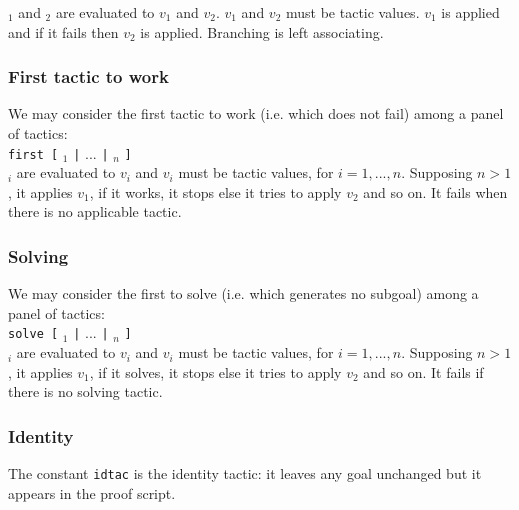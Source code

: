 {\tacexpr}$_1$ and {\tacexpr}$_2$ are evaluated to $v_1$ and
$v_2$. $v_1$ and $v_2$ must be tactic values. $v_1$ is applied and if
it fails then $v_2$ is applied. Branching is left associating.

\subsubsection{First tactic to work}

We may consider the first tactic to work (i.e. which does not fail) among a
panel of tactics:\\

{\tt first [} {\tacexpr}$_1$ {\tt |} $...$ {\tt |} {\tacexpr}$_n$ {\tt ]}\\

{\tacexpr}$_i$ are evaluated to $v_i$ and $v_i$ must be tactic values, for 
$i=1,...,n$. Supposing $n>1$, it applies $v_1$, if it works, it stops else it
tries to apply $v_2$ and so on. It fails when there is no applicable tactic.\\

\ErrMsg {}

\subsubsection{Solving}

We may consider the first to solve (i.e. which generates no subgoal) among a
panel of tactics:\\

{\tt solve [} {\tacexpr}$_1$ {\tt |} $...$ {\tt |} {\tacexpr}$_n$ {\tt ]}\\

{\tacexpr}$_i$ are evaluated to $v_i$ and $v_i$ must be tactic values, for 
$i=1,...,n$. Supposing $n>1$, it applies $v_1$, if it solves, it stops else it
tries to apply $v_2$ and so on. It fails if there is no solving tactic.\\

\ErrMsg {}

\subsubsection{Identity}

The constant {\tt idtac} is the identity tactic: it leaves any goal
unchanged but it appears in the proof script.\\

